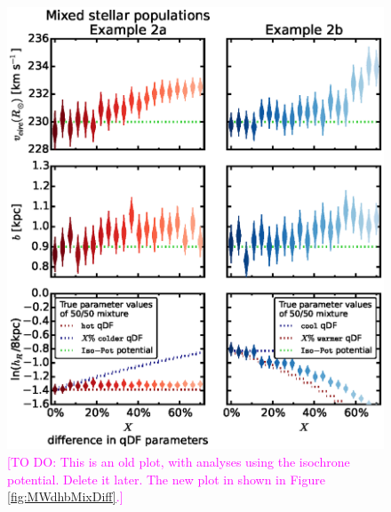 \documentclass[iop,revtex4]{emulateapj}
\newcommand{\Wilma}[1]{\textcolor{Magenta}{#1}}
\begin{document}
\begin{appendix}
\begin{figure}[!htbp]
\begin{minipage}{0.48\textwidth}
\label{fig:IsoSphFlexMixCont}
\end{minipage}
\hfill
\begin{minipage}{0.48\textwidth}
\centering
\includegraphics[scale=0.55]{figs/isoSphFlexMixDiff_violins_2.eps}
\caption{\Wilma{[TO DO: This is an old plot, with analyses using the isochrone potential. Delete it later.  The new plot in shown in Figure \ref{fig:MWdhbMixDiff}.]}}
\label{fig:IsoSphFlexMixDiff}
\end{minipage}
\end{figure}


\end{appendix}
\end{document}
